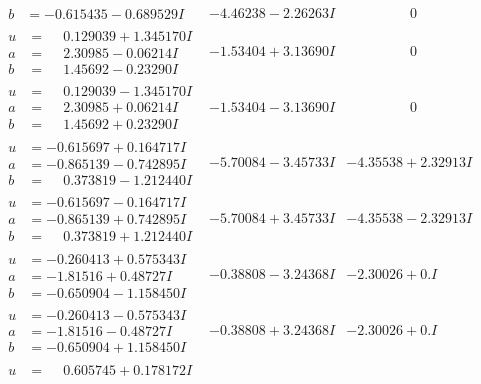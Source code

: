 \documentclass[1p]{elsarticle_modified}
\theoremstyle{definition}
\begin{document}
$$\begin{array}{c|c|c}
\begin{aligned}
b &= -0.615435 - 0.689529 I\end{aligned}
 & -4.46238 - 2.26263 I & \phantom{-0.000000 } 0 \\ \hline\begin{aligned}
u &= \phantom{-}0.129039 + 1.345170 I \\
a &= \phantom{-}2.30985 - 0.06214 I \\
b &= \phantom{-}1.45692 - 0.23290 I\end{aligned}
 & -1.53404 + 3.13690 I & \phantom{-0.000000 } 0 \\ \hline\begin{aligned}
u &= \phantom{-}0.129039 - 1.345170 I \\
a &= \phantom{-}2.30985 + 0.06214 I \\
b &= \phantom{-}1.45692 + 0.23290 I\end{aligned}
 & -1.53404 - 3.13690 I & \phantom{-0.000000 } 0 \\ \hline\begin{aligned}
u &= -0.615697 + 0.164717 I \\
a &= -0.865139 - 0.742895 I \\
b &= \phantom{-}0.373819 - 1.212440 I\end{aligned}
 & -5.70084 - 3.45733 I & -4.35538 + 2.32913 I \\ \hline\begin{aligned}
u &= -0.615697 - 0.164717 I \\
a &= -0.865139 + 0.742895 I \\
b &= \phantom{-}0.373819 + 1.212440 I\end{aligned}
 & -5.70084 + 3.45733 I & -4.35538 - 2.32913 I \\ \hline\begin{aligned}
u &= -0.260413 + 0.575343 I \\
a &= -1.81516 + 0.48727 I \\
b &= -0.650904 - 1.158450 I\end{aligned}
 & -0.38808 - 3.24368 I & -2.30026 + 0. I\phantom{ +0.000000I} \\ \hline\begin{aligned}
u &= -0.260413 - 0.575343 I \\
a &= -1.81516 - 0.48727 I \\
b &= -0.650904 + 1.158450 I\end{aligned}
 & -0.38808 + 3.24368 I & -2.30026 + 0. I\phantom{ +0.000000I} \\ \hline\begin{aligned}
u &= \phantom{-}0.605745 + 0.178172 I \\

\end{aligned}
\end{array}$$
\end{document}

